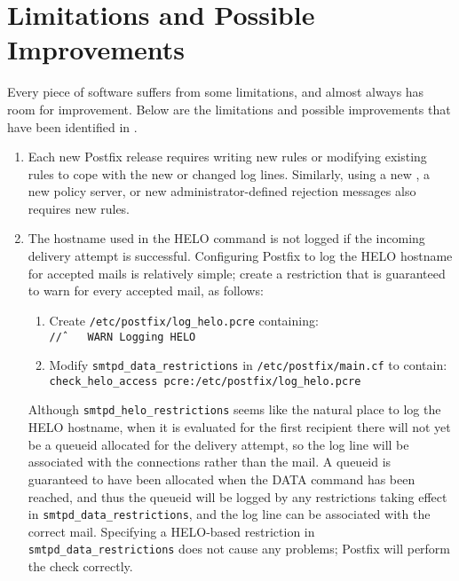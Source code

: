 \section{Limitations and Possible Improvements}

\label{limitations and improvements in implementation}

Every piece of software suffers from some limitations, and almost always
has room for improvement.  Below are the limitations and possible
improvements that have been identified in \parsername{}.

\label{logging helo}

\begin{enumerate}

    \item Each new Postfix release requires writing new rules or modifying
        existing rules to cope with the new or changed log lines.
        Similarly, using a new , a new policy server, or new
        administrator-defined rejection messages also requires new rules.

    \item The hostname used in the HELO command is not logged if the
        incoming delivery attempt is successful.  Configuring Postfix to
        log the HELO hostname for accepted mails is relatively simple;
        create a restriction that is guaranteed to warn for every accepted
        mail, as follows:

        \begin{enumerate}

            \item Create \texttt{/etc/postfix/log\_helo.pcre}
                containing:\newline{}
                \tab{}\texttt{/\^/~~~~WARN~Logging~HELO}

            \item Modify \texttt{smtpd\_data\_restrictions} in
                \texttt{/etc/postfix/main.cf} to contain:\newline{}
                \tab{}\texttt{check\_helo\_access~pcre:/etc/postfix/log\_helo.pcre}

        \end{enumerate}

        Although \texttt{smtpd\_helo\_restrictions} seems like the natural
        place to log the HELO hostname, when it is evaluated for the first
        recipient there will not yet be a queueid allocated for the
        delivery attempt, so the log line will be associated with the
        connections rather than the mail.  A queueid is guaranteed to have
        been allocated when the DATA command has been reached, and thus the
        queueid will be logged by any restrictions taking effect in
        \texttt{smtpd\_data\_restrictions}, and the log line can be
        associated with the correct mail.  Specifying a HELO-based
        restriction in \texttt{smtpd\_data\_restrictions} does not cause
        any problems; Postfix will perform the check correctly.


\end{enumerate}
